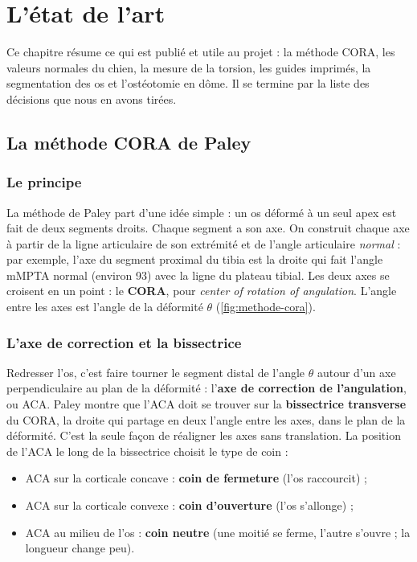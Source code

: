 \chapter{L'état de l'art}
\label{chap:etat}

\begin{chapeau}
Ce chapitre résume ce qui est publié et utile au projet : la méthode CORA, les valeurs normales du chien, la mesure de
la torsion, les guides imprimés, la segmentation des os et l'ostéotomie en dôme. Il se termine par la liste des
décisions que nous en avons tirées.
\end{chapeau}

\section{La méthode CORA de Paley}
\label{sec:cora-paley}

\subsection{Le principe}

La méthode de Paley \cite{paley2002} part d'une idée simple : un os déformé à un seul apex est fait de deux segments
droits. Chaque segment a son axe. On construit chaque axe à partir de la ligne articulaire de son extrémité et de
l'angle articulaire \emph{normal} : par exemple, l'axe du segment proximal du tibia est la droite qui fait l'angle
mMPTA normal (environ 93\degre{}) avec la ligne du plateau tibial. Les deux axes se croisent en un point : le
\textbf{CORA}, pour \emph{center of rotation of angulation}. L'angle entre les axes est l'angle de la déformité
$\theta$ (\cref{fig:methode-cora}).


\subsection{L'axe de correction et la bissectrice}

Redresser l'os, c'est faire tourner le segment distal de l'angle $\theta$ autour d'un axe perpendiculaire au plan de
la déformité : l'\textbf{axe de correction de l'angulation}, ou ACA. Paley montre que l'ACA doit se trouver sur la
\textbf{bissectrice transverse} du CORA, la droite qui partage en deux l'angle entre les axes, dans le plan de la
déformité. C'est la seule façon de réaligner les axes sans translation. La position de l'ACA le long de la bissectrice
choisit le type de coin :
\begin{itemize}
  \item ACA sur la corticale concave : \textbf{coin de fermeture} (l'os raccourcit) ;
  \item ACA sur la corticale convexe : \textbf{coin d'ouverture} (l'os s'allonge) ;
  \item ACA au milieu de l'os : \textbf{coin neutre} (une moitié se ferme, l'autre s'ouvre ; la longueur change peu).
\end{itemize}

